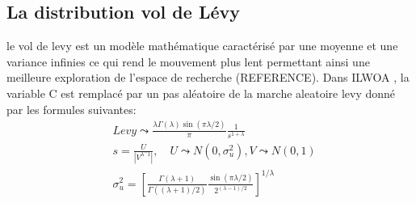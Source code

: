 \documentclass[12pt]{article}
\begin{document}
\subsection{La distribution vol de Lévy}
le vol de levy est un modèle mathématique caractérisé par une moyenne et une variance infinies ce qui rend le mouvement plus lent permettant ainsi une meilleure exploration de l'espace de recherche (REFERENCE).
Dans ILWOA , la variable C est remplacé par un pas aléatoire de la marche aleatoire levy donné par les formules suivantes:
\begin{align*}
&Levy\leadsto\frac{\lambda\Gamma(\lambda)\sin(\pi\lambda/2)}{\pi}\frac{1}{s^{1+\lambda}}\\
&s=\frac{U}{\left|{V^{\lambda^-1}}\right| },\quad U\leadsto N(0,\sigma_u^2),V\leadsto N(0,1)\\
&\sigma_u^2=[\frac{\Gamma(\lambda+1)}{\Gamma((\lambda+1)/2)}\frac{\sin(\pi\lambda/2)}{2^{(\lambda-1)/2}}]^{1/\lambda}
\end{align*}
\end{document}
